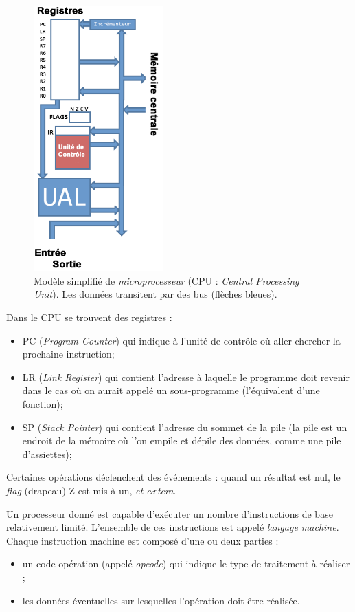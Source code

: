 \begin{figure}[H]
    \begin{center}
        \includegraphics[width=5cm]{ch-turing/img/vn2.png}
    \end{center}
    \caption*{Modèle simplifié de \textit{microprocesseur} (CPU : \textit{Central Processing Unit}).
        Les données transitent par des bus (flèches bleues).}
\end{figure}



Dans le CPU se trouvent des registres :
\begin{itemize}
    \item 	PC (\textit{Program Counter}) qui indique à l'unité de contrôle où aller chercher la prochaine instruction;
    \item 	LR	(\textit{Link Register}) qui contient l'adresse à laquelle le programme doit revenir dans le cas où on aurait appelé un sous-programme (l'équivalent d'une fonction);
    \item 	SP (\textit{Stack Pointer}) qui contient l'adresse du sommet de la pile (la pile est un endroit de la mémoire où l'on \og empile\fg{} et \og dépile\fg{} des données, comme une pile d'assiettes);
\end{itemize}
Certaines opérations déclenchent des \og événements\fg{} : quand un résultat est nul, le \textit{flag} (drapeau) Z est mis à un, \textit{et c\ae tera}.

Un processeur donné est capable d'exécuter un nombre d'instructions de base relativement limité. L'ensemble de ces instructions est appelé \textit{langage machine}. Chaque instruction machine est composé d'une ou deux parties :
\begin{itemize}
    \item 	un code opération (appelé \textit{opcode}) qui indique le type de traitement à réaliser ;
    \item 	les données éventuelles sur lesquelles l'opération doit être réalisée.
\end{itemize}

